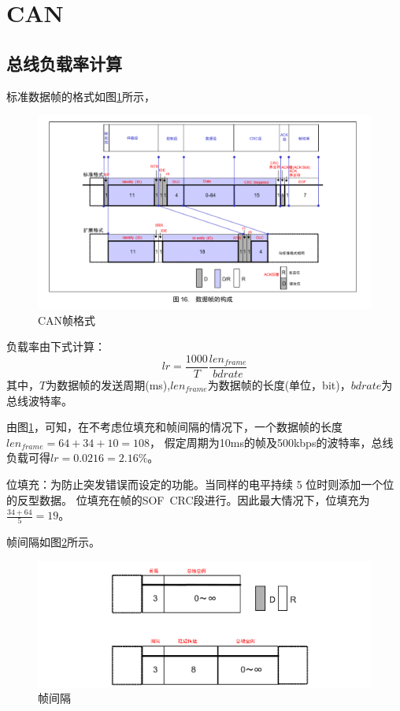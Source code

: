 \section{CAN}
\subsection{总线负载率计算}
标准数据帧的格式如图\ref{fig:can_frame}所示，
\begin{figure}[ht]
    \centering
    \includegraphics[scale=0.7]{pic/can_frame.png}
    \caption{CAN帧格式}
    \label{fig:can_frame}
\end{figure}

负载率由下式计算：
$$lr = \frac{1000}{T} \frac{len_{frame}}{bdrate} $$
其中，$T$为数据帧的发送周期(ms),$len_{frame}$为数据帧的长度(单位，bit)，$bdrate$为总线波特率。

由图\ref{fig:can_frame}，可知，在不考虑位填充和帧间隔的情况下，一个数据帧的长度$len_{frame}=64+34+10=108$，
假定周期为10ms的帧及500kbps的波特率，总线负载可得$lr=0.0216=2.16\%$。

位填充：为防止突发错误而设定的功能。当同样的电平持续 5 位时则添加一个位的反型数据。 
位填充在帧的SOF~CRC段进行。因此最大情况下，位填充为$\frac{34+64}{5}=19$。

帧间隔如图\ref{fig:frame_jiange}所示。
\begin{figure}[ht]
    \centering
    \includegraphics[]{pic/frame_jiange.png}
    \caption{帧间隔}
    \label{fig:frame_jiange}
\end{figure}

